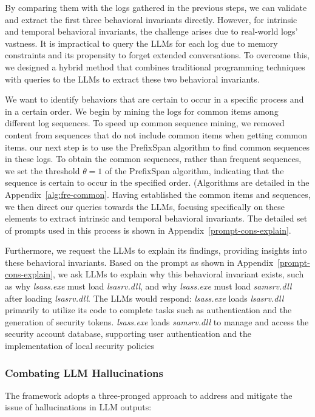 By comparing them with the logs gathered in the previous steps, we can validate and extract the first three behavioral invariants directly.
However, for intrinsic and temporal behavioral invariants, the challenge arises due to real-world logs' vastness. It is impractical to query the LLMs for each log due to memory constraints and its propensity to forget extended conversations. To overcome this, we designed a hybrid method that combines traditional programming techniques with queries to the LLMs to extract these two behavioral invariants.

We want to identify behaviors that are certain to occur in a specific process and in a certain order. 
We begin by mining the logs for common items among different log sequences.   
To speed up common sequence mining, we removed content from sequences that do not include common items when getting common items.
our next step is to use the PrefixSpan algorithm to find common sequences in these logs. 
To obtain the common sequences, rather than frequent sequences, we set the threshold \( \theta =1\) of the PrefixSpan algorithm, indicating that the sequence is certain to occur in the specified order.
(Algorithms are detailed in the Appendix~\ref{alg:fre-common}.
Having established the common items and sequences, we then direct our queries towards the LLMs, focusing specifically on these elements to extract intrinsic and temporal behavioral invariants. 
The detailed set of prompts used in this process is shown in Appendix~\ref{prompt-cons-explain}.

Furthermore, we request the LLMs to explain its findings, providing insights into these behavioral invariants.
Based on the prompt as shown in Appendix~\ref{prompt-cons-explain}, we ask LLMs to explain why this behavioral invariant exists, such as why \textit{lsass.exe} must load \textit{lsasrv.dll}, and why \textit{lsass.exe} must load \textit{samsrv.dll} after loading \textit{lsasrv.dll}. 
The LLMs would respond: \textit{lsass.exe} loads \textit{lsasrv.dll} primarily to utilize its code to complete tasks such as authentication and the generation of security tokens. 
\textit{lsass.exe} loads \textit{samsrv.dll} to manage and access the security account database, supporting user authentication and the implementation of local security policies


\subsubsection{Combating LLM Hallucinations}
The framework adopts a three-pronged approach to address and mitigate the issue of hallucinations in LLM outputs:

